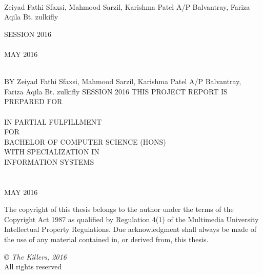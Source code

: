 \documentclass[12pt, oneside]{Thesis}
\begin{document}
\begin{titlepage}
\begin{center}

{\LARGE \ttitle}\\[0.4cm] 
\vfill
\Large{Zeiyad Fathi Sfaxsi, Mahmood Sarzil, Karishma Patel A/P Balvantray, Fariza Aqila Bt. zulkifly} 

\vfill
\normalsize{SESSION 2016}
\vfill
\normalsize\FACNAME\\
\normalsize \UNIVNAME\\
{\normalsize MAY 2016}\\ 
\vfill
\end{center}

\end{titlepage}
\thispagestyle{empty}
\begin{center}

	{\LARGE \ttitle}\\[0.4cm] %
	\vfill
	\footnotesize{BY}
	\vfill
	\Large{Zeiyad Fathi Sfaxsi, Mahmood Sarzil, Karishma Patel A/P Balvantray, Fariza Aqila Bt. zulkifly} %
	\vfill
	\footnotesize{SESSION 2016}
	\vfill
	\footnotesize{THIS PROJECT REPORT IS PREPARED FOR}
	\vfil
	\normalsize\FACNAME\\
	\normalsize \UNIVNAME\\
	\normalsize{IN PARTIAL FULFILLMENT}\\
	\normalsize{FOR}\\
	\vfil
	\normalsize{BACHELOR OF COMPUTER SCIENCE (HONS)}\\
	\normalsize{WITH SPECIALIZATION IN}\\
	\normalsize{INFORMATION SYSTEMS}\\
	\vfil
	\normalsize\FACNAME\\
	\vfil
	\Large \UNIVNAME\\
	\vfil
	{\normalsize MAY 2016}\\ %
	\vfill
\end{center}

\newpage
\thispagestyle{empty}

The copyright of this thesis belongs to the author under the terms of the Copyright Act 1987 as qualified by Regulation 4(1) of the Multimedia University Intellectual Property Regulations. Due acknowledgment shall always be made of the use of any material contained in, or derived from, this thesis. 

\vfil
\textit{© The Killers, 2016}\\
All rights reserved
\end{document}
